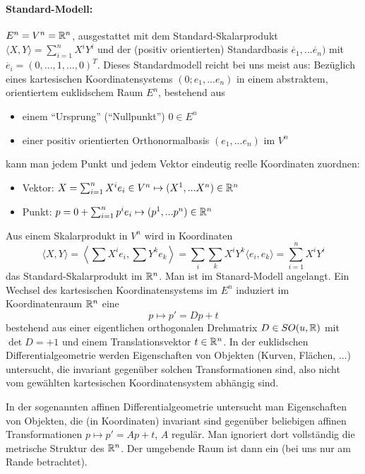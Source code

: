 \paragraph*{Standard-Modell:} \(E^n = V^n = \mathbb{R}^n\), ausgestattet mit dem Standard-Skalarprodukt \(\langle X, Y \rangle = \sum_{i=1}^n X^iY^i\) und der (positiv orientierten) Standardbasis \(\mathring{e_1}, ... \mathring{e_n})\) mit \(\mathring{e_i} = (0, \dots, 1, \dots, 0)^T\).
Dieses Standardmodell reicht bei uns meist aus:
Bezüglich eines kartesischen Koordinatensystems \((0; e_1, ... e_n)\) in einem abstraktem, orientiertem euklidschem Raum \(E^n\), bestehend aus 
  \begin{itemize}
   \item einem "`Ursprung"' ("`Nullpunkt"') \(0 \in E^n\)
   \item einer positiv orientierten Orthonormalbasis \((e_1, ... e_n)\) im \(V^n\)
  \end{itemize}
kann man jedem Punkt und jedem Vektor eindeutig reelle Koordinaten zuordnen:
  \begin{itemize}
   \item Vektor: \(X = \sum_{i=1}^n X^ie_i \in V^n \mapsto (X^1, ... X^n) \in \mathbb{R}^n\)
   \item Punkt: \(p = 0 + \sum_{i=1}^n p^ie_i \mapsto (p^1, ... p^n) \in \mathbb{R}^n\)
  \end{itemize}
Aus einem Skalarprodukt in \(V^n\) wird in Koordinaten
  \[
   \langle X, Y \rangle = \left\langle \sum X^ie_i, \sum Y^ke_k \right\rangle = \sum_{i}\sum_{k} X^iY^k \langle e_i, e_k \rangle = \sum_{i=1}^n X^iY^i
  \]
das Standard-Skalarprodukt im \(\mathbb{R}^n\).
Man ist im Stanard-Modell angelangt.
Ein Wechsel des kartesischen Koordinatensystems im \(E^n\) induziert im Koordinatenraum \(\mathbb{R}^n\) eine  \[p \mapsto p' = Dp + t\] bestehend aus einer eigentlichen orthogonalen Drehmatrix \(D \in SO(u, \mathbb{R})\) mit \(\det D = +1\) und einem Translationsvektor \(t \in \mathbb{R}^n\).
In der euklidschen Differentialgeometrie werden Eigenschaften von Objekten (Kurven, Flächen, ...) untersucht, die invariant gegenüber solchen Transformationen sind, also nicht vom gewählten kartesischen Koordinatensystem abhängig sind. \\
  \begin{bemerkung} In der sogenannten affinen Differentialgeometrie untersucht man Eigenschaften von Objekten, die (in Koordinaten) invariant sind gegenüber beliebigen affinen Transformationen \(p \mapsto p' = Ap + t\), \(A\) regulär. Man ignoriert dort vollständig die metrische Struktur des \(\mathbb{R}^n\).
  Der umgebende Raum ist dann ein  (bei uns nur am Rande betrachtet).
  \end{bemerkung}
